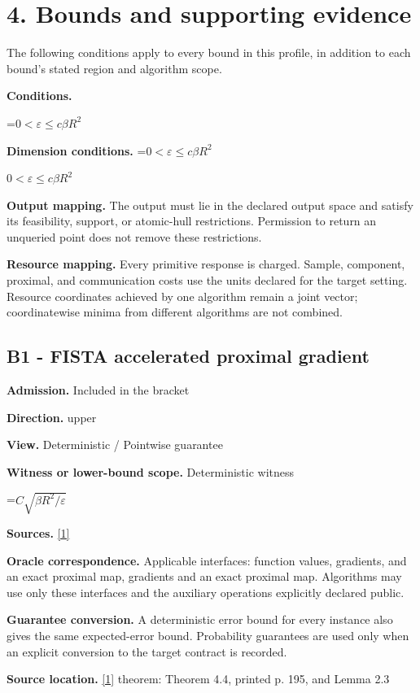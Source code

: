 \documentclass[10pt,a4paper]{article}
\newcommand{\AtlasMath}[1]{\par\begingroup\centering\setbox0=\hbox{$\displaystyle #1$}\ifdim\wd0>1.4\linewidth\typeout{ATLAS WIDE FORMULA: \the\wd0}\fi\ifdim\wd0>\linewidth\resizebox{\linewidth}{!}{\box0}\else\box0\fi\par\endgroup}
\newcommand{\AtlasInlineMath}[1]{\begingroup\setbox0=\hbox{$#1$}\ifdim\wd0>.4\linewidth\endgroup\AtlasMath{#1}\else\endgroup$#1$\fi}
\begin{document}
\section{4. Bounds and supporting evidence}
The following conditions apply to every bound in this profile, in addition to each bound's stated region and algorithm scope.

\textbf{Conditions.} 
\AtlasMath{0<\varepsilon\le c\beta R^2}


\textbf{Dimension conditions.} \AtlasInlineMath{0<\varepsilon\le c\beta R^2}

\textbf{Output mapping.} The output must lie in the declared output space and satisfy its feasibility, support, or atomic-hull restrictions. Permission to return an unqueried point does not remove these restrictions.

\textbf{Resource mapping.} Every primitive response is charged. Sample, component, proximal, and communication costs use the units declared for the target setting. Resource coordinates achieved by one algorithm remain a joint vector; coordinatewise minima from different algorithms are not combined.

\subsection{B1 - FISTA accelerated proximal gradient}
\textbf{Admission.} Included in the bracket

\textbf{Direction.} upper

\textbf{View.} Deterministic / Pointwise guarantee

\textbf{Witness or lower-bound scope.} Deterministic witness

\AtlasMath{C\sqrt{\beta R^2/\varepsilon}}
\textbf{Sources.} \href{https://www.tau.ac.il/~becka/FISTA.pdf}{[1]}

\textbf{Oracle correspondence.} Applicable interfaces: function values, gradients, and an exact proximal map, gradients and an exact proximal map. Algorithms may use only these interfaces and the auxiliary operations explicitly declared public.

\textbf{Guarantee conversion.} A deterministic error bound for every instance also gives the same expected-error bound. Probability guarantees are used only when an explicit conversion to the target contract is recorded.

\textbf{Source location.} \href{https://www.tau.ac.il/~becka/FISTA.pdf}{[1]} theorem: Theorem 4.4, printed p. 195, and Lemma 2.3
\end{document}

